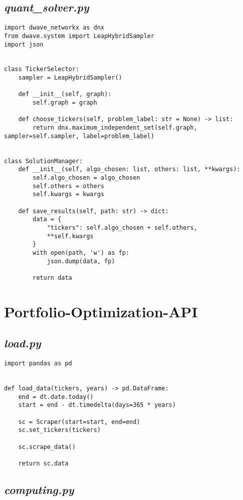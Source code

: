 \documentclass[12pt,a4paper,twoside,openany]{book}
\begin{document}
\subsection*{\textit{quant\_solver.py}}
\begin{verbatim}
import dwave_networkx as dnx
from dwave.system import LeapHybridSampler
import json


class TickerSelector:
    sampler = LeapHybridSampler()

    def __init__(self, graph):
        self.graph = graph

    def choose_tickers(self, problem_label: str = None) -> list:
        return dnx.maximum_independent_set(self.graph, sampler=self.sampler, label=problem_label)


class SolutionManager:
    def __init__(self, algo_chosen: list, others: list, **kwargs):
        self.algo_chosen = algo_chosen
        self.others = others
        self.kwargs = kwargs

    def save_results(self, path: str) -> dict:
        data = {
            "tickers": self.algo_chosen + self.others,
            **self.kwargs
        }
        with open(path, 'w') as fp:
            json.dump(data, fp)

        return data

\end{verbatim}

\section*{Portfolio-Optimization-API}

\subsection*{\textit{load.py}}



\begin{verbatim}
import pandas as pd


def load_data(tickers, years) -> pd.DataFrame:
    end = dt.date.today()
    start = end - dt.timedelta(days=365 * years)

    sc = Scraper(start=start, end=end)
    sc.set_tickers(tickers)

    sc.scrape_data()

    return sc.data
\end{verbatim}

\subsection*{\textit{computing.py}}
\end{document}
